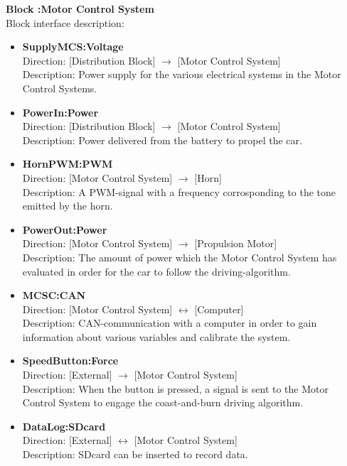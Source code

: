 \textbf{Block :Motor Control System}\\
Block interface description:
\begin{itemize}
	\item \textbf{SupplyMCS:Voltage}\\
	Direction: [Distribution Block] $\rightarrow$ [Motor Control System]\\
	Description: Power supply for the various electrical systems in the Motor Control Systems.
	\item \textbf{PowerIn:Power}\\
	Direction: [Distribution Block] $\rightarrow$ [Motor Control System]\\
	Description: Power delivered from the battery to propel the car.
	\item \textbf{HornPWM:PWM}\\
	Direction: [Motor Control System] $\rightarrow$ [Horn]\\
	Description: A PWM-signal with a frequency corrosponding to the tone emitted by the horn.
	\item \textbf{PowerOut:Power}\\
	Direction: [Motor Control System] $\rightarrow$ [Propulsion Motor]\\
	Description: The amount of power which the Motor Control System has evaluated in order for the car to follow the driving-algorithm.
	\item \textbf{MCSC:CAN}\\
	Direction: [Motor Control System] $\leftrightarrow$ [Computer]\\
	Description: CAN-communication with a computer in order to gain information about various variables and calibrate the system.
	\item \textbf{SpeedButton:Force}\\
	Direction: [External] $\rightarrow$ [Motor Control System]\\
	Description: When the button is pressed, a signal is sent to the Motor Control System to engage the coast-and-burn driving algorithm.
	\item \textbf{DataLog:SDcard}\\
	Direction: [External] $\leftrightarrow$ [Motor Control System]\\
	Description: SDcard can be inserted to record data.
\end{itemize}


